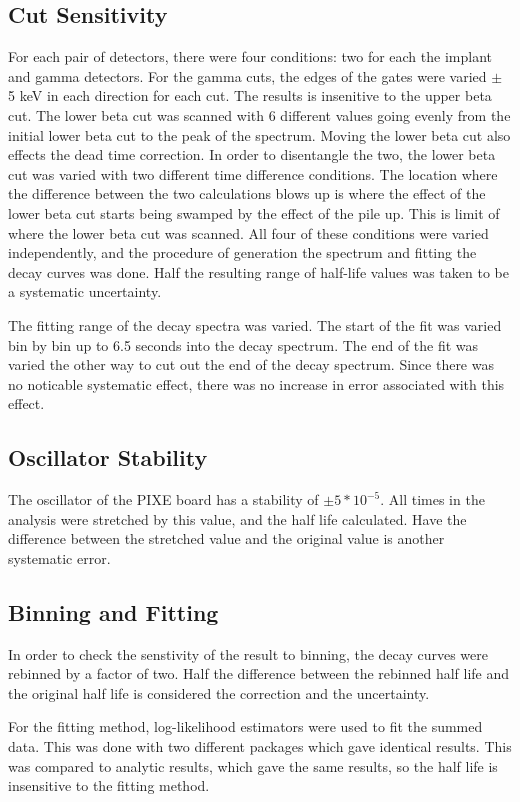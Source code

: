 \subsection{Cut Sensitivity}
For each pair of detectors, there were four conditions: two for each the implant and gamma detectors. 
For the gamma cuts, the edges of the gates were varied $\pm$ 5 keV in each direction for each cut.
The results is insenitive to the upper beta cut.
The lower beta cut was scanned with 6 different values going evenly from the initial lower beta cut to the peak of the spectrum.
Moving the lower beta cut also effects the dead time correction.
In order to disentangle the two, the lower beta cut was varied with two different time difference conditions.
The location where the difference between the two calculations blows up is where the effect of the lower beta cut starts being swamped by the effect of the pile up.
This is limit of where the lower beta cut was scanned.
All four of these conditions were varied independently, and the procedure of generation the spectrum and fitting the decay curves was done.
Half the resulting range of half-life values was taken to be a systematic uncertainty.
	
The fitting range of the decay spectra was varied. 
The start of the fit was varied bin by bin up to 6.5 seconds into the decay spectrum.
The end of the fit was varied the other way to cut out the end of the decay spectrum.
Since there was no noticable systematic effect, there was no increase in error associated with this effect.

\subsection{Oscillator Stability}
The oscillator of the PIXE board has a stability of $\pm 5 * 10^{-5}$.
All times in the analysis were stretched by this value, and the half life calculated.
Have the difference between the stretched value and the original value is another systematic error.

\subsection{Binning and Fitting}
In order to check the senstivity of the result to binning, the decay curves were rebinned by a factor of two.
Half the difference between the rebinned half life and the original half life is considered the correction and the uncertainty.

For the fitting method, log-likelihood estimators were used to fit the summed data.
This was done with two different packages which gave identical results. 
This was compared to analytic results, which gave the same results, so the half life is insensitive to the fitting method.

